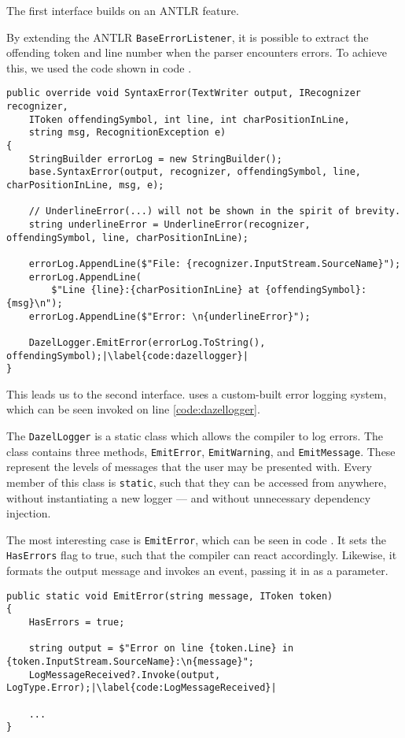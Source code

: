 The first interface builds on an ANTLR feature. 

By extending the ANTLR \texttt{BaseErrorListener}, it is possible to extract the offending token and line number when the parser encounters errors. To achieve this, we used the code shown in code .

\begin{lstlisting}[language=CSharp, caption={The altered \texttt{SyntaxError} method.}, label={lst:SyntaxErrorCode}, escapechar=|]
public override void SyntaxError(TextWriter output, IRecognizer recognizer, 
    IToken offendingSymbol, int line, int charPositionInLine,
    string msg, RecognitionException e)
{
    StringBuilder errorLog = new StringBuilder();
    base.SyntaxError(output, recognizer, offendingSymbol, line, charPositionInLine, msg, e);
    
    // UnderlineError(...) will not be shown in the spirit of brevity.
    string underlineError = UnderlineError(recognizer, offendingSymbol, line, charPositionInLine);

    errorLog.AppendLine($"File: {recognizer.InputStream.SourceName}");
    errorLog.AppendLine(
        $"Line {line}:{charPositionInLine} at {offendingSymbol}: {msg}\n");
    errorLog.AppendLine($"Error: \n{underlineError}");

    DazelLogger.EmitError(errorLog.ToString(), offendingSymbol);|\label{code:dazellogger}|
}
\end{lstlisting}

This leads us to the second interface. \dazel{} uses a custom-built error logging system, which can be seen invoked on line \ref{code:dazellogger}.

The \texttt{DazelLogger} is a static class which allows the \dazel{} compiler to log errors. The class contains three methods, \texttt{EmitError}, \texttt{EmitWarning}, and \texttt{EmitMessage}. These represent the levels of messages that the user may be presented with. Every member of this class is \texttt{static}, such that they can be accessed from anywhere, without instantiating a new logger — and without unnecessary dependency injection.

The most interesting case is \texttt{EmitError}, which can be seen in code . It sets the \texttt{HasErrors} flag to true, such that the \dazel{} compiler can react accordingly. Likewise, it formats the output message and invokes an event, passing it in as a parameter.

\begin{lstlisting}[language=CSharp, caption={\texttt{EmitError} in the \texttt{DazelLogger}.}, label={lst:EmitErrorCode}, escapechar=|]
public static void EmitError(string message, IToken token)
{
    HasErrors = true;
    
    string output = $"Error on line {token.Line} in {token.InputStream.SourceName}:\n{message}";
    LogMessageReceived?.Invoke(output, LogType.Error);|\label{code:LogMessageReceived}|

    ...
}
\end{lstlisting}

